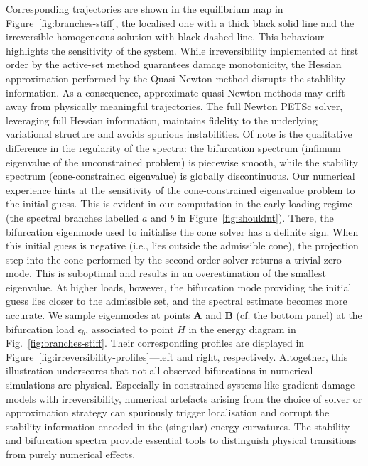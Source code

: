 {    Corresponding trajectories are shown in the equilibrium map in Figure~\ref{fig:branches-stiff}, the localised one with a thick black solid line and the irreversible homogeneous solution with black dashed line.
    This behaviour highlights the sensitivity of the system. While irreversibility implemented at first order by the active-set method guarantees damage monotonicity, the Hessian approximation performed by the Quasi-Newton method disrupts the stablility information.
    As a consequence, approximate quasi-Newton methods may drift away from physically meaningful trajectories.
    The full Newton PETSc solver, leveraging full Hessian information, maintains fidelity to the underlying variational structure and avoids spurious instabilities.
    Of note is the qualitative difference in the regularity of the spectra: the bifurcation spectrum (infimum eigenvalue of the unconstrained problem) is piecewise smooth, while the stability spectrum (cone-constrained eigenvalue) is globally discontinuous.
    Our numerical experience hints at the sensitivity of the cone-constrained eigenvalue problem to the initial guess. This is evident in our computation in the early loading regime (the spectral branches labelled  $a$ and $b$ in Figure~\ref{fig:shouldnt}).
    There, the bifurcation eigenmode used to initialise the cone solver has a definite sign.
    When this initial guess is negative (i.e., lies outside the admissible cone), the projection step into the cone performed by the second order solver returns a trivial zero mode.
    This is suboptimal and results in an overestimation of the smallest eigenvalue.
    At higher loads, however, the bifurcation mode providing the initial guess lies closer to the admissible set, and the spectral estimate becomes more accurate.
    We sample eigenmodes at points \textbf{A} and \textbf{B} (cf. the bottom panel) at the bifurcation load $\bar{\epsilon}_b$, associated to point $H$ in the energy diagram in Fig.~\ref{fig:branches-stiff}. Their corresponding profiles are displayed in Figure~\ref{fig:irreversibility-profiles}—left and right, respectively.
    Altogether, this illustration underscores that not all observed bifurcations in numerical simulations are physical.
    Especially in constrained systems like gradient damage models with irreversibility, numerical artefacts arising from the choice of solver or approximation strategy can spuriously trigger localisation and corrupt the stability information encoded in the (singular) energy curvatures.
    The stability and bifurcation spectra provide essential tools to distinguish physical transitions from purely numerical effects.}

